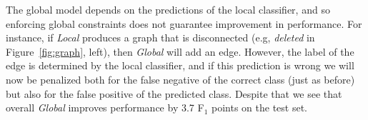 The global model depends on the predictions of the local classifier, and so enforcing global constraints does not guarantee improvement in performance. For instance, if \emph{Local} produces a graph that is disconnected (e.g, \emph{deleted} in Figure~\ref{fig:graph}, left), then \emph{Global} will add an edge. However, the label of the edge is determined by the local classifier, and if this prediction is wrong we will now be penalized both for the false negative of the correct class (just as before) but also for the false positive of the predicted class.  Despite that we see that overall \emph{Global} improves performance by 3.7 F$_{1}$ points on the test set.
